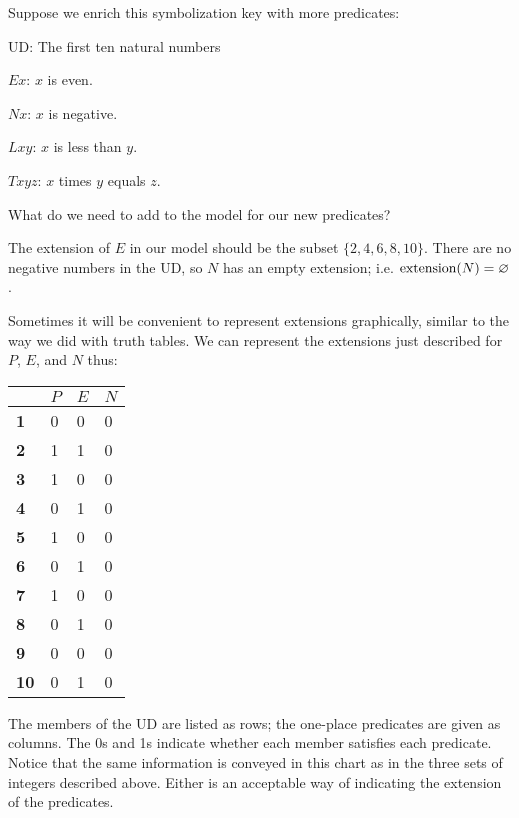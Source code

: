 Suppose we enrich this symbolization key with more predicates:
\label{10UD}
\begin{ekey}
\item{UD:} The first ten natural numbers
\item{$Ex$:} $x$ is even.
\item{$Nx$:} $x$ is negative.
\item{$Lxy$:} $x$ is less than $y$.
\item{$Txyz$:} $x$ times $y$ equals $z$.
\end{ekey}
What do we need to add to the model for our new predicates?

The extension of $E$ in our model should be the subset $\{2, 4, 6, 8, 10\}$. There are no negative numbers in the UD, so $N$ has an empty extension; i.e. $\mbox{extension}(N)=\varnothing$.

Sometimes it will be convenient to represent extensions graphically, similar to the way we did with truth tables. We can represent the extensions just described for $P$, $E$, and $N$ thus:

\begin{table}[h!]
\centering
\begin{tabular}{l|l|l|l}
            & $P$ & $E$ & $N$ \\ \hline
\textbf{1}  & 0  & 0          & 0          \\
\textbf{2}  & 1  & 1          & 0          \\
\textbf{3}  & 1  & 0          & 0          \\
\textbf{4}  & 0  & 1          & 0          \\
\textbf{5}  & 1  & 0          & 0          \\
\textbf{6}  & 0  & 1          & 0          \\
\textbf{7}  & 1  & 0          & 0          \\
\textbf{8}  & 0  & 1          & 0          \\
\textbf{9}  & 0  & 0          & 0          \\
\textbf{10} & 0 & 1          & 0         
\end{tabular}
\end{table}

The members of the UD are listed as rows; the one-place predicates are given as columns. The 0s and 1s indicate whether each member satisfies each predicate. Notice that the same information is conveyed in this chart as in the three sets of integers described above. Either is an acceptable way of indicating the extension of the predicates.

